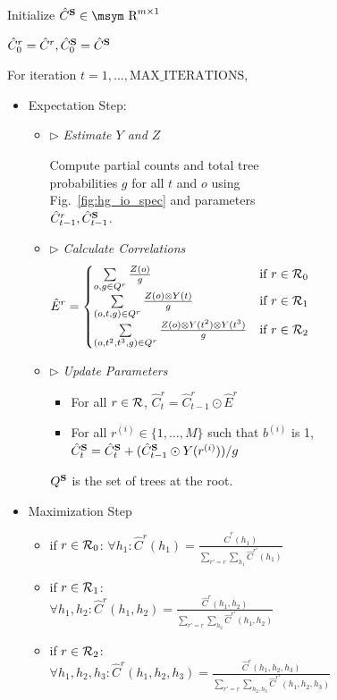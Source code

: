 \documentclass[11pt]{article}
\newcommand{\rione}{r^{(i)}}
\newcommand{\rules}{{\cal R}}
\newcommand{\e}[1]{\hat{#1}}
\newcommand{\bS}{{\bf S}}
\newcommand{\reals}{\mbox{\msym R}}
\begin{document}
\begin{figure}[t!]
{\begin{footnotesize}
\begin{subfigure}{1.05\columnwidth}
	Initialize $\e{C}^\bS \in \reals^{m \times 1}$ 
	
	$\e{C}_0^r = \e{C}^r, \e{C}_0^\bS = \e{C}^\bS$
	
	For iteration $t=1, \dots, \textrm{MAX\_ITERATIONS}$, 
	\begin{itemize}			
		\item Expectation Step: 
		 \begin{itemize}[label={}]
			\item $\triangleright$ \emph{Estimate $Y$ and $Z$}
			
			Compute partial counts and total tree probabilities $g$ for all $t$ and $o$ using Fig.~\ref{fig:hg_io_spec} and parameters $\e{C}_{t-1}^r, \e{C}_{t-1}^\bS$.  
			\item $\triangleright$ \emph{Calculate Correlations}
				\begin{align*}
					\e{E}^r &= \begin{cases}
					\sum\limits_{o, g \in Q^r} \frac{Z(o)}{g} &\textrm{if }r \in \rules_0 \\
					\sum\limits_{\left(o, t, g\right) \in Q^r} \frac{Z(o) \otimes Y(t)}{g} &\textrm{if }r \in \rules_1 \\
					\sum\limits_{\left(o,t^2,t^3,g\right) \in Q^r} \frac{Z(o) \otimes Y(t^2) \otimes Y(t^3)}{g} &\textrm{if }r \in \rules_2 
					\end{cases}
				\end{align*}
			\item $\triangleright$ \emph{Update Parameters}
		 	\begin{itemize}[label={}]
		 		\item For all $r \in \rules$, $\e{C}^r_t = \e{C}^r_{t-1} \odot \e{E}^r$
		 		\item For all $\rione \in \{1, \dots, M\}$ such that $b^{(i)}$ is 1, $\e{C}^\bS_t = \e{C}^\bS_t + (\e{C}^\bS_{t-1} \odot Y(\rione)) / g $
		 	\end{itemize}
		 	$Q^\bS$ is the set of trees at the root.
		\end{itemize}
		\item Maximization Step
			\begin{itemize}[label={},nolistsep]%
				\item if $r \in \rules_0$: $\forall h_1: \e{C}^r(h_1) = \frac{\e{C}^r(h_1)}{\sum_{r'=r} \sum_{h_1}\e{C}^{r'}(h_1)}$ 
				\item if $r \in \rules_1$: $\forall h_1, h_2: \e{C}^r(h_1, h_2) = \frac{\e{C}^r(h_1, h_2)}{\sum_{r'=r} \sum_{h_2}\e{C}^{r'}(h_1, h_2)}$ 
				\item if $r \in \rules_2$: $\forall h_1, h_2, h_3: \e{C}^r(h_1, h_2, h_3) = \frac{\e{C}^r(h_1, h_2, h_3)}{\sum_{r'=r}\sum_{h_2, h_3}\e{C}^{r'}(h_1, h_2, h_3)}$ 

\end{itemize}
\end{itemize}
\end{subfigure}
\end{footnotesize}}
\end{figure}
\end{document}
